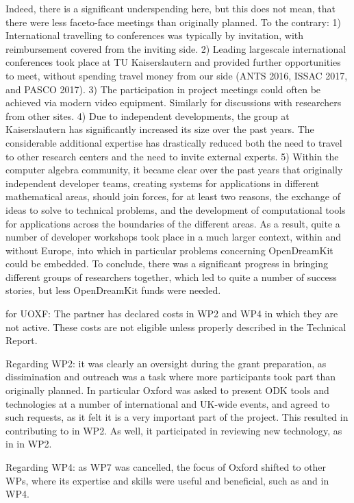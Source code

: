 Indeed, there is a significant underspending here, but this does not mean, that there were less faceto-face
meetings than originally planned. To the contrary: 1) International travelling to conferences was typically 
by invitation, with reimbursement covered from the inviting side. 2) Leading largescale international conferences 
took place at TU Kaiserslautern and provided further opportunities to meet, without spending travel money from our 
side (ANTS 2016, ISSAC 2017, and PASCO 2017). 3) The participation in project meetings could often be achieved 
via modern video equipment. Similarly for discussions with researchers from other sites. 4) Due to independent 
developments, the group at Kaiserslautern has significantly increased its size over the past years. 
The considerable additional expertise has drastically reduced both the need to travel to other research centers 
and the need to invite external experts. 5) Within the computer algebra community, it became clear over the past 
years that originally independent developer teams, creating systems for applications in different mathematical 
areas, should join forces, for at least two reasons, the exchange of ideas to solve to  technical problems, and
the development of computational tools for applications across the boundaries of the different areas. As a result, 
quite a number of developer workshops took place in a much larger context, within and without Europe, into 
which in particular problems concerning OpenDreamKit could be embedded. To conclude, there was a significant 
progress in bringing different groups of researchers together, which led to quite a number of success stories, 
but less OpenDreamKit funds were needed.

for UOXF:
The partner has declared costs in WP2 and WP4 in which they are not active. These costs are
not eligible unless properly described in the Technical Report.

Regarding WP2: it was clearly an oversight during the grant preparation, as dissimination and outreach was a task where more participants took part than originally planned. In particular Oxford was asked to present ODK tools and technologies at a number of international and UK-wide events,
and agreed to such requests, as it felt it is a very important part of the project. This resulted in contributing to  in WP2. As well, it participated in reviewing new technology, as in  in WP2.

Regarding WP4: as WP7 was cancelled, the focus of Oxford shifted to other WPs, where its expertise and skills were useful and beneficial, such as  and  in WP4.

